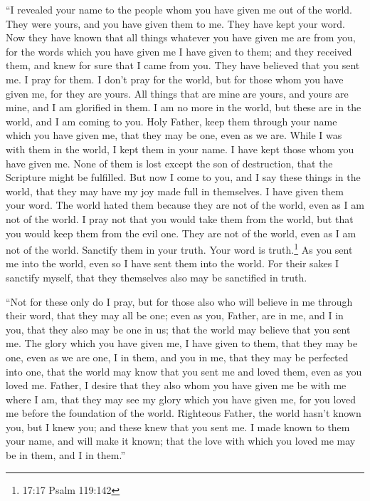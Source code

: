  ``I revealed your name to the people whom you have given me
out of the world. They were yours, and you have given them to me. They
have kept your word.  Now they have known that all things
whatever you have given me are from you,  for the words
which you have given me I have given to them; and they received them,
and knew for sure that I came from you. They have believed that you sent
me.  I pray for them. I don't pray for the world, but for
those whom you have given me, for they are yours.  All
things that are mine are yours, and yours are mine, and I am glorified
in them.  I am no more in the world, but these are in the
world, and I am coming to you. Holy Father, keep them through your name
which you have given me, that they may be one, even as we are.
 While I was with them in the world, I kept them in your
name. I have kept those whom you have given me. None of them is lost
except the son of destruction, that the Scripture might be fulfilled.
 But now I come to you, and I say these things in the
world, that they may have my joy made full in themselves. 
I have given them your word. The world hated them because they are not
of the world, even as I am not of the world.  I pray not
that you would take them from the world, but that you would keep them
from the evil one.  They are not of the world, even as I am
not of the world.  Sanctify them in your truth. Your word
is truth.\footnote{17:17 Psalm 119:142}  As you sent me
into the world, even so I have sent them into the world. 
For their sakes I sanctify myself, that they themselves also may be
sanctified in truth.

 ``Not for these only do I pray, but for those also who
will believe in me through their word,  that they may all
be one; even as you, Father, are in me, and I in you, that they also may
be one in us; that the world may believe that you sent me. 
The glory which you have given me, I have given to them, that they may
be one, even as we are one,  I in them, and you in me, that
they may be perfected into one, that the world may know that you sent me
and loved them, even as you loved me.  Father, I desire
that they also whom you have given me be with me where I am, that they
may see my glory which you have given me, for you loved me before the
foundation of the world.  Righteous Father, the world
hasn't known you, but I knew you; and these knew that you sent me.
 I made known to them your name, and will make it known;
that the love with which you loved me may be in them, and I in them.''

